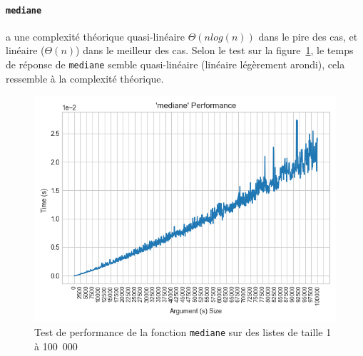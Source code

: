 \documentclass[12pt]{article}
\begin{document}
\paragraph{\texttt{mediane}} a une complexité théorique quasi-linéaire $\Theta(nlog(n))$ dans le pire des cas, et linéaire ($\Theta(n)$) dans le meilleur des cas. Selon le test sur la figure~\ref{perfmed}, le temps de réponse de \texttt{mediane} semble quasi-linéaire (linéaire légèrement arondi), cela ressemble à la complexité théorique.
     \begin{figure}[!h]
        \centering
        \includegraphics[scale=0.8]{Images/Performance/Stats/performance_mediane_100000.png}
        \caption{Test de performance de la fonction \texttt{mediane} sur des listes de taille 1 à 100~000}
        \label{perfmed}
    \end{figure}
\end{document}
